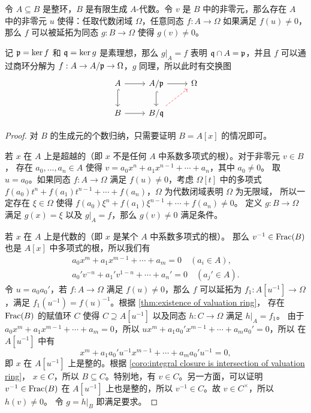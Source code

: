 \begin{proposition}
  令 $A\subseteq B$ 是整环，$B$ 是有限生成 $A$-代数。令 $v$ 是 $B$ 中的非零元，那么存在
  $A$ 中的非零元 $u$ 使得：任取代数闭域 $\Omega$，任意同态 $f:A\to\Omega$ 如果满足
  $f(u)\neq 0$，那么 $f$ 可以被延拓为同态 $g:B\to\Omega$ 使得 $g(v)\neq 0$。
\end{proposition}
\begin{remark}
  记 $\mathfrak{p}=\ker f$ 和 $\mathfrak{q}=\ker g$ 是素理想，那么
  $g|_A=f$ 表明 $\mathfrak{q}\cap A=\mathfrak{p}$，并且 $f$
  可以通过商环分解为 $f:A\to A/\mathfrak{p}\to\Omega$，$g$ 同理，所以此时有交换图
  \[
    \begin{tikzcd}
      A\arrow[r]\arrow[d,hookrightarrow] 
      & A/\ideal p\arrow[r]\arrow[d,hookrightarrow]  & \Omega \\
      B\arrow[r] & B/\ideal q\arrow[ur,dashed,red] &
    \end{tikzcd}  
  \]
\end{remark}
\begin{proof}
  对 $B$ 的生成元的个数归纳，只需要证明 $B=A[x]$ 的情况即可。

  若 $x$ 在 $A$ 上是超越的（即 $x$ 不是任何 $A$ 中系数多项式的根）。对于非零元 $v\in B$，
  存在 $a_0,\dots,a_n\in A$ 使得 $v=a_0x^n+a_1x^{n-1}+\cdots+a_n$，其中 $a_0\neq 0$。
  取 $u=a_0$。如果同态 $f:A\to\Omega$ 满足 $f(u)\neq 0$，考虑 $\Omega[t]$ 中的多项式
  $f(a_0)t^n+f(a_1)t^{n-1}+\cdots+f(a_n)$，$\Omega$ 为代数闭域表明 $\Omega$ 为无限域，
  所以一定存在 $\xi\in\Omega$ 使得 $f(a_0)\xi^n+f(a_1)\xi^{n-1}+\cdots+f(a_n)\neq 0$。
  定义 $g:B\to\Omega$ 满足 $g(x)=\xi$ 以及 $g|_A=f$，那么 $g(v)\neq 0$ 满足条件。

  若 $x$ 在 $A$ 上是代数的（即 $x$ 是某个 $A$ 中系数多项式的根）。
  那么 $v^{-1}\in \operatorname{Frac}(B)$ 也是 $A[x]$ 中多项式的根，所以我们有
  \begin{gather*}
    a_0x^m+a_1x^{m-1}+\cdots+a_m=0\quad (a_i\in A),\\
    a_0'v^{-n}+a_1'v^{1-n}+\cdots+a_n'=0\quad (a_j'\in A).
  \end{gather*}
  令 $u=a_0a_0'$，若 $f:A\to\Omega$ 满足 $f(u)\neq 0$，那么 $f$ 可以延拓为
  $f_1:A[u^{-1}]\to\Omega$，满足 $f_1(u^{-1})=f(u)^{-1}$。根据 \autoref{thm:existence of valuation ring}，
  存在 $\operatorname{Frac}(B)$ 的赋值环 $C$ 使得 $C\supseteq A[u^{-1}]$ 以及同态 $h:C\to\Omega$ 满足 $h|_A=f_1$。
  由于 $a_0x^m+a_1x^{m-1}+\cdots+a_m=0$，所以 $ux^m+a_1a_0'x^{m-1}+\cdots+a_ma_0'=0$，所以
  在 $A[u^{-1}]$ 中有
  \[
    x^m+a_1a_0'u^{-1}x^{m-1}+\cdots+a_ma_0'u^{-1}=0,
  \]
  即 $x$ 在 $A[u^{-1}]$ 上是整的。根据 \autoref{coro:integral closure is intersection of valuation ring}，
  $x\in C$，所以 $B\subseteq C$。特别地，有 $v\in C$。另一方面，可以证明 $v^{-1}\in\operatorname{Frac}(B)$
  在 $A[u^{-1}]$ 上也是整的，所以 $v^{-1}\in C$。故 $v\in C^\times$，所以 $h(v)\neq 0$。
  令 $g=h|_B$ 即满足要求。
\end{proof}

